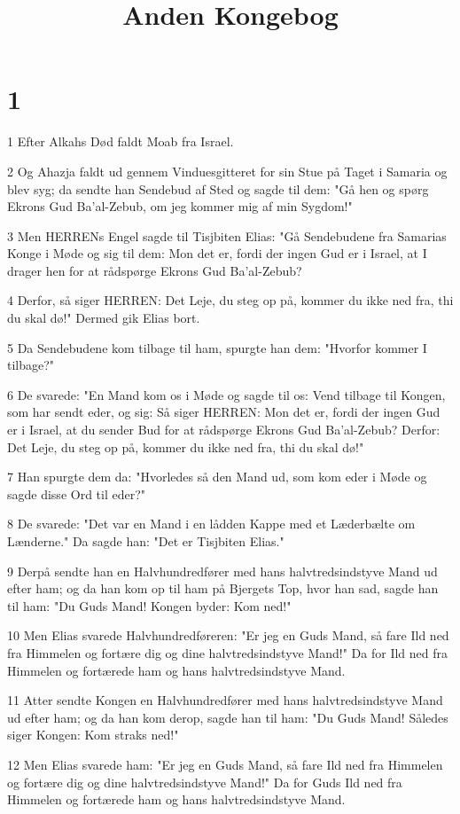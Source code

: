 

\title{Anden Kongebog}


\chapter{1}

\par 1 Efter Alkahs Død faldt Moab fra Israel.
\par 2 Og Ahazja faldt ud gennem Vinduesgitteret for sin Stue på Taget i Samaria og blev syg; da sendte han Sendebud af Sted og sagde til dem: "Gå hen og spørg Ekrons Gud Ba'al-Zebub, om jeg kommer mig af min Sygdom!"
\par 3 Men HERRENs Engel sagde til Tisjbiten Elias: "Gå Sendebudene fra Samarias Konge i Møde og sig til dem: Mon det er, fordi der ingen Gud er i Israel, at I drager hen for at rådspørge Ekrons Gud Ba'al-Zebub?
\par 4 Derfor, så siger HERREN: Det Leje, du steg op på, kommer du ikke ned fra, thi du skal dø!" Dermed gik Elias bort.
\par 5 Da Sendebudene kom tilbage til ham, spurgte han dem: "Hvorfor kommer I tilbage?"
\par 6 De svarede: "En Mand kom os i Møde og sagde til os: Vend tilbage til Kongen, som har sendt eder, og sig: Så siger HERREN: Mon det er, fordi der ingen Gud er i Israel, at du sender Bud for at rådspørge Ekrons Gud Ba'al-Zebub? Derfor: Det Leje, du steg op på, kommer du ikke ned fra, thi du skal dø!"
\par 7 Han spurgte dem da: "Hvorledes så den Mand ud, som kom eder i Møde og sagde disse Ord til eder?"
\par 8 De svarede: "Det var en Mand i en lådden Kappe med et Læderbælte om Lænderne." Da sagde han: "Det er Tisjbiten Elias."
\par 9 Derpå sendte han en Halvhundredfører med hans halvtredsindstyve Mand ud efter ham; og da han kom op til ham på Bjergets Top, hvor han sad, sagde han til ham: "Du Guds Mand! Kongen byder: Kom ned!"
\par 10 Men Elias svarede Halvhundredføreren: "Er jeg en Guds Mand, så fare Ild ned fra Himmelen og fortære dig og dine halvtredsindstyve Mand!" Da for Ild ned fra Himmelen og fortærede ham og hans halvtredsindstyve Mand.
\par 11 Atter sendte Kongen en Halvhundredfører med hans halvtredsindstyve Mand ud efter ham; og da han kom derop, sagde han til ham: "Du Guds Mand! Således siger Kongen: Kom straks ned!"
\par 12 Men Elias svarede ham: "Er jeg en Guds Mand, så fare Ild ned fra Himmelen og fortære dig og dine halvtredsindstyve Mand!" Da for Guds Ild ned fra Himmelen og fortærede ham og hans halvtredsindstyve Mand.
